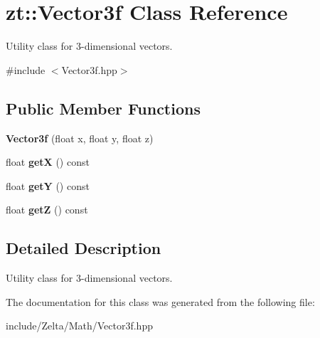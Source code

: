 \hypertarget{classzt_1_1_vector3f}{}\section{zt\+:\+:Vector3f Class Reference}
\label{classzt_1_1_vector3f}


Utility class for 3-\/dimensional vectors.  




{\ttfamily \#include $<$Vector3f.\+hpp$>$}

\subsection*{Public Member Functions}
\begin{DoxyCompactItemize}
\item 
\mbox{\label{classzt_1_1_vector3f_a03ad5be2fb03a578701e548d3b5237ad}} 
{\bfseries Vector3f} (float x, float y, float z)
\item 
\mbox{\label{classzt_1_1_vector3f_a12839eef9586c885c2f1c59b4ec616f6}} 
float {\bfseries getX} () const
\item 
\mbox{\label{classzt_1_1_vector3f_a1455e373af6cc3b84f1a9dad7514b17f}} 
float {\bfseries getY} () const
\item 
\mbox{\label{classzt_1_1_vector3f_a52d3d420b275b484e67671e0c101e712}} 
float {\bfseries getZ} () const
\end{DoxyCompactItemize}


\subsection{Detailed Description}
Utility class for 3-\/dimensional vectors. 

The documentation for this class was generated from the following file\+:\begin{DoxyCompactItemize}
\item 
include/\+Zelta/\+Math/Vector3f.\+hpp\end{DoxyCompactItemize}
